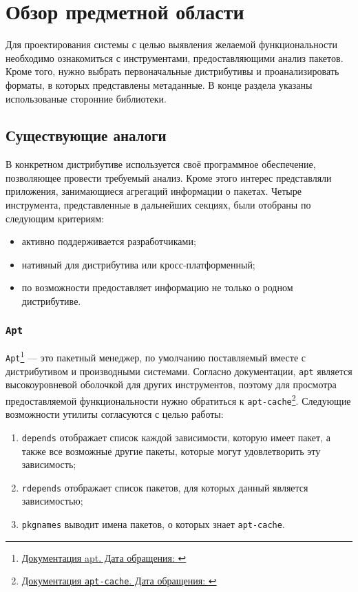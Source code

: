 
\section{Обзор предметной области}
\label{sec:relatedworks}
Для проектирования системы с целью выявления желаемой функциональности необходимо ознакомиться с инструментами, предоставляющими анализ пакетов.
Кроме того, нужно выбрать первоначальные дистрибутивы и проанализировать форматы, в которых представлены метаданные. В конце раздела указаны использованые сторонние библиотеки.

\subsection{Существующие аналоги}
В конкретном дистрибутиве используется своё программное обеспечение, позволяющее провести требуемый анализ. Кроме этого интерес представляли приложения, занимающиеся агрегаций информации о пакетах.
Четыре инструмента, представленные в дальнейших секциях, были отобраны по следующим критериям:

\begin{itemize}
	\item активно поддерживается разработчиками;
	\item нативный для дистрибутива или кросс-платформенный;
	\item по возможности предоставляет информацию не только о родном дистрибутиве.
\end{itemize}

\subsubsection{\texttt{Apt}}
\texttt{Apt}\footnote{\href{https://manpages.debian.org/stretch/apt/apt.8.en.html\#SCRIPT_USAGE_AND_DIFFERENCES_FROM_OTHER_APT_TOOLS/}{Документация apt. Дата обращения: }} --- это пакетный менеджер, по умолчанию поставляемый вместе с дистрибутивом {\debian} и производными системами.
Согласно документации, \texttt{apt} является высокоуровневой оболочкой для других инструментов, поэтому для просмотра предоставляемой функциональности нужно обратиться к \texttt{apt-cache}\footnote{\href{https://manpages.debian.org/stretch/apt/apt-cache.8.en.html}{Документация \texttt{apt-cache}. Дата обращения: }}.
Следующие возможности утилиты согласуются с целью работы:
\begin{enumerate}
	\item \texttt{depends} отображает список каждой зависимости, которую имеет пакет, а также все возможные другие пакеты, которые могут удовлетворить эту зависимость;
	\item \texttt{rdepends} отображает список пакетов, для которых данный является зависимостью;
	\item \texttt{pkgnames} выводит имена пакетов, о которых знает \texttt{apt-cache}.
\end{enumerate}

